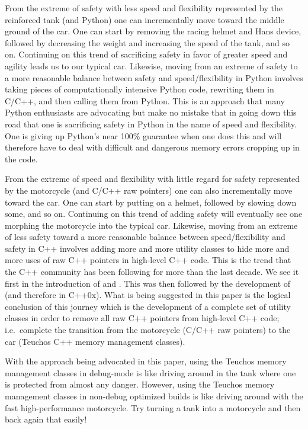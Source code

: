 \documentclass[pdf,ps2pdf,11pt]{SANDreport}
\begin{document}
From the extreme of safety with less speed and flexibility represented
by the reinforced tank (and Python) one can incrementally move toward
the middle ground of the car.  One can start by removing the racing
helmet and Hans device, followed by decreasing the weight and
increasing the speed of the tank, and so on.  Continuing on this trend
of sacrificing safety in favor of greater speed and agility leads us
to our typical car.  Likewise, moving from an extreme of safety to a
more reasonable balance between safety and speed/flexibility in Python
involves taking pieces of computationally intensive Python code,
rewriting them in C/C++, and then calling them from Python.  This is
an approach that many Python enthusiasts are advocating
{}\cite{PythonForSCPerforamnce08} but make no mistake that in going
down this road that one is sacrificing safety in Python in the name of
speed and flexibility.  One is giving up Python's near 100\% guarantee
when one does this and will therefore have to deal with difficult and
dangerous memory errors cropping up in the code.

From the extreme of speed and flexibility with little regard for
safety represented by the motorcycle (and C/C++ raw pointers) one can
also incrementally move toward the car.  One can start by putting on a
helmet, followed by slowing down some, and so on.  Continuing on this
trend of adding safety will eventually see one morphing the motorcycle
into the typical car.  Likewise, moving from an extreme of less safety
toward a more reasonable balance between speed/flexibility and safety
in C++ involves adding more and more utility classes to hide more and
more uses of raw C++ pointers in high-level C++ code.  This is the
trend that the C++ community has been following for more than the last
decade.  We see it first in the introduction of {}
and {}.  This was then followed by the development of
{} (and therefore {} in
C++0x).  What is being suggested in this paper is the logical
conclusion of this journey which is the development of a complete set
of utility classes in order to remove all raw C++ pointers from
high-level C++ code; i.e.\ complete the transition from the motorcycle
(C/C++ raw pointers) to the car (Teuchos C++ memory management
classes).

With the approach being advocated in this paper, using the Teuchos
memory management classes in debug-mode is like driving around in the
tank where one is protected from almost any danger.  However, using
the Teuchos memory management classes in non-debug optimized builds is
like driving around with the fast high-performance motorcycle.  Try
turning a tank into a motorcycle and then back again that easily!
\end{document}
